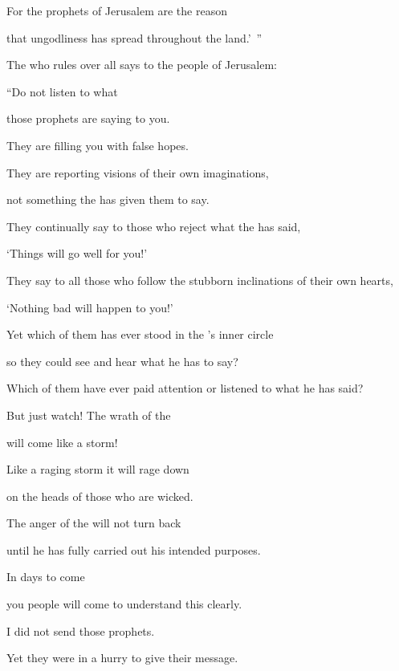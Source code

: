 {\par }{\Q For
the prophets
of Jerusalem
are the reason

\par }{\Q that ungodliness
has spread throughout
the land.’ ”
\par }{\Q {}The
{}
who rules over all
says
to the people of Jerusalem:

\par }{\Q “Do not
listen
to
what
\par }{\Q those prophets
are saying
to you.
\par }{\Q They
are filling
you with false hopes.
\par }{\Q They are reporting
visions
of their own imaginations,
\par }{\Q not
something the
{}
has given them to say.
\par }{\Q {}They continually say
to those who reject
what the
{}
has said,
\par }{\Q ‘Things will go
well
for you!’

\par }{\Q They say
to all
those who follow
the stubborn inclinations
of their own hearts,
\par }{\Q ‘Nothing
bad
will happen to you!’
\par }{\Q {}Yet
which of them has ever
stood
in the
{}’s
inner circle
\par }{\Q so they could see
and hear
what
he has to say?

\par }{\Q Which of them have ever
paid attention
or listened
to what
he has said?
\par }{\Q {}But
just watch! The wrath
of the {}
\par }{\Q will come like a storm!

\par }{\Q Like a raging
storm
it will rage
down
\par }{\Q on
the heads
of those
who are
wicked.
\par }{\Q {}The anger
of the {}
will not
turn back
\par }{\Q until
he has fully
carried out
his intended
purposes.
\par }{\Q In days
to come
\par }{\Q you people will come to understand
this clearly.
\par }{\Q {}I did not
send
those prophets.
\par }{\Q Yet they
were in a hurry
to give their message.

}
